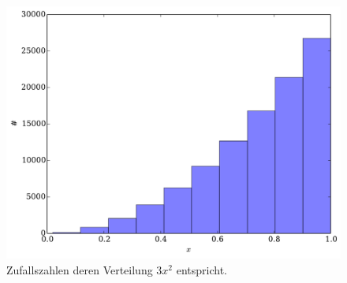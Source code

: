 \documentclass{scrartcl}
\begin{document}
\begin{figure}[H]
    \centering
    \includegraphics[width=.5\textwidth]{plots/3xsquared.pdf}
    \caption{Zufallszahlen deren Verteilung $3x^2$ entspricht.}
    \label{fig:3xsquared}
\end{figure}
\end{document}
